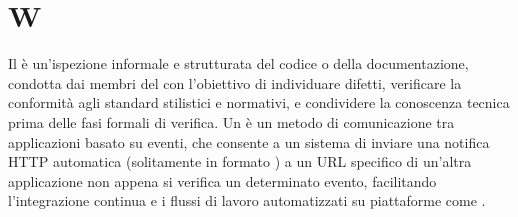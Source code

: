 \section{W}
Il  è un'ispezione informale e strutturata del codice o della documentazione, condotta dai membri del  con l'obiettivo di individuare difetti, verificare la conformità agli standard stilistici e normativi, e condividere la conoscenza tecnica prima delle fasi formali di verifica.
Un  è un metodo di comunicazione tra applicazioni basato su eventi, che consente a un sistema di inviare una notifica HTTP automatica (solitamente in formato ) a un URL specifico di un'altra applicazione non appena si verifica un determinato evento, facilitando l'integrazione continua e i flussi di lavoro automatizzati su piattaforme come .
